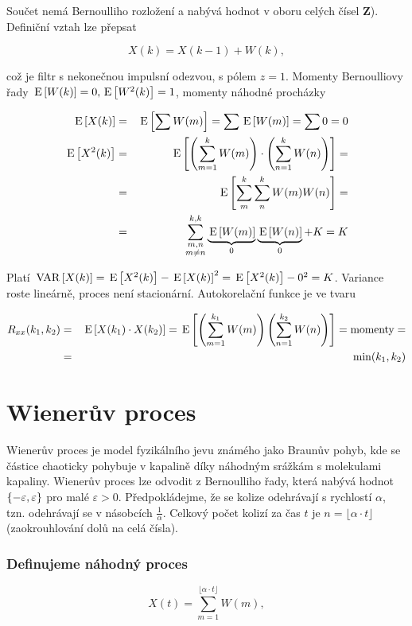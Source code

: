 Součet nemá Bernoulliho rozložení a nabývá hodnot v oboru celých čísel \textbf{Z}). Definiční vztah lze přepsat

\[ X(k) =X(k-1)+W(k), \]

což je filtr s nekonečnou impulsní odezvou, s pólem $z=1$. Momenty Bernoulliovy řady $\,\mathrm{E}\left[W(k)\right]=0,\,\mathrm{E}\left[W^2(k)\right]=1$, momenty náhodné procházky

\begin{eqnarray*}
\,\mathrm{E}\left[X(k)\right] & = & \,\mathrm{E}\left[\sum W(m)\right] =  \sum \,\mathrm{E}\left[W(m)\right] = \sum 0 = 0\\
\,\mathrm{E}\left[X^2(k)\right] & = & \,\mathrm{E}\left[\left(\sum_{m=1}^k W(m)\right)\cdot\left(\sum_{n=1}^k W(n)\right)\right]=\\
& = & \,\mathrm{E}\left[\sum_m^k\sum_n^k W(m)W(n)\right]=\\
& = & \sum^{k,k}_{\substack{m,n\\m\neq n}}\underbrace{\,\mathrm{E}\left[W(m)\right]}_0 \underbrace{\,\mathrm{E}\left[W(n)\right]}_0+K = K
\end{eqnarray*}

Platí $\,\mathrm{VAR}\left[X(k)\right]= \,\mathrm{E}\left[X^2(k)\right] - \,\mathrm{E}\left[X(k)\right]^2 = \,\mathrm{E}\left[X^2(k)\right] - 0^2 =  K$. Variance roste lineárně, proces není stacionární. Autokorelační funkce je ve tvaru

\begin{eqnarray*}
R_{xx}(k_1,k_2) &=& \,\mathrm{E}\left[X(k_1)\cdot X(k_2)\right]=\,\mathrm{E}\left[\left(\sum_{m=1}^{k_1}W(m)\right)\left(\sum_{n=1}^{k_2}W(n)\right)\right]=\text{momenty}=\\
& = & \min(k_1,k_2)
\end{eqnarray*}

\section{Wienerův proces}
Wienerův proces je model fyzikálního jevu známého jako Braunův pohyb, kde se částice chaoticky pohybuje v kapalině díky náhodným srážkám s molekulami kapaliny. Wienerův proces lze odvodit z Bernoulliho řady, která nabývá hodnot $\left\{-\varepsilon,\varepsilon\right\}$ pro malé $\varepsilon>0$. Předpokládejme, že se kolize odehrávají s rychlostí $\alpha$, tzn. odehrávají se v násobcích $\frac{1}{\alpha}$. Celkový počet kolizí za čas $t$ je $n=\lfloor\alpha\cdot t\rfloor$ (zaokrouhlování dolů na celá čísla).

\subsubsection*{Definujeme náhodný proces}
\[ X(t)=\sum_{m=1}^{\lfloor\alpha\cdot t\rfloor} W(m), \]

